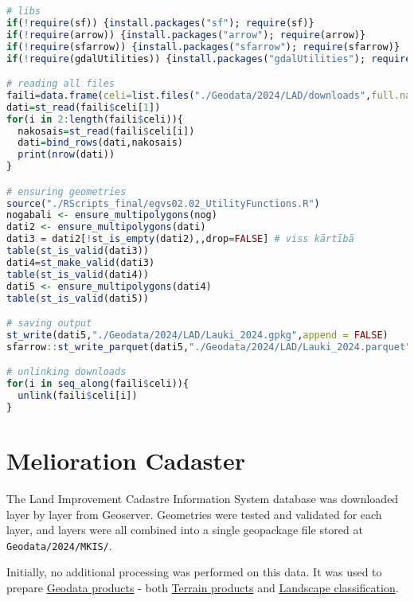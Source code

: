 \documentclass[
]{book}
\newcommand{\passthrough}[1]{#1}
\begin{document}
\begin{lstlisting}[language=R]
# libs
if(!require(sf)) {install.packages("sf"); require(sf)}
if(!require(arrow)) {install.packages("arrow"); require(arrow)}
if(!require(sfarrow)) {install.packages("sfarrow"); require(sfarrow)}
if(!require(gdalUtilities)) {install.packages("gdalUtilities"); require(gdalUtilities)}

# reading all files
faili=data.frame(celi=list.files("./Geodata/2024/LAD/downloads",full.names = TRUE))
dati=st_read(faili$celi[1])
for(i in 2:length(faili$celi)){
  nakosais=st_read(faili$celi[i])
  dati=bind_rows(dati,nakosais)
  print(nrow(dati))
}

# ensuring geometries
source("./RScripts_final/egvs02.02_UtilityFunctions.R")
nogabali <- ensure_multipolygons(nog)
dati2 <- ensure_multipolygons(dati)
dati3 = dati2[!st_is_empty(dati2),,drop=FALSE] # viss kārtībā
table(st_is_valid(dati3)) 
dati4=st_make_valid(dati3)
table(st_is_valid(dati4))
dati5 <- ensure_multipolygons(dati4)
table(st_is_valid(dati5))

# saving output
st_write(dati5,"./Geodata/2024/LAD/Lauki_2024.gpkg",append = FALSE)
sfarrow::st_write_parquet(dati5,"./Geodata/2024/LAD/Lauki_2024.parquet")

# unlinking downloads
for(i in seq_along(faili$celi)){
  unlink(faili$celi[i])
}
\end{lstlisting}

\section{Melioration Cadaster}\label{Ch04.03}

The Land Improvement Cadastre Information System database was downloaded layer
by layer from Geoserver. Geometries were tested and validated for each layer, and
layers were all combined into a single geopackage file stored at \passthrough{\lstinline!Geodata/2024/MKIS/!}.

Initially, no additional processing was performed on this data. It was used to
prepare \hyperref[Ch05]{Geodata products} - both \hyperref[Ch05.01]{Terrain products} and \hyperref[Ch05.03]{Landscape classification}.
\end{document}
